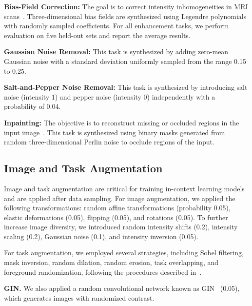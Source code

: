 \vspace{0.4em}\noindent\textbf{Bias-Field Correction:} The goal is to correct intensity inhomogeneities in MRI scans~\cite{goldfryd2021deep}. Three-dimensional bias fields are synthesized using Legendre polynomials with randomly sampled coefficients. For all enhancement tasks, we perform evaluation on five held-out sets and report the average results.

\vspace{0.4em}\noindent\textbf{Gaussian Noise Removal:} This task is synthesized by adding zero-mean Gaussian noise with a standard deviation uniformly sampled from the range 0.15 to 0.25.

\vspace{0.4em}\noindent\textbf{Salt-and-Pepper Noise Removal:} This task is synthesized by introducing salt noise (intensity 1) and pepper noise (intensity 0) independently with a probability of 0.04.

\vspace{0.4em}\noindent\textbf{Inpainting:} The objective is to reconstruct missing or occluded regions in the input image~\cite{liu2021symmetric}. This task is synthesized using binary masks generated from random three-dimensional Perlin noise to occlude regions of the input.



\subsection{Image and Task Augmentation}
\label{sec:aug}

Image and task augmentation are critical for training in-context learning models and are applied after data sampling.  
For image augmentation, we applied the following transformations: random affine transformations (probability 0.05), elastic deformations (0.05), flipping (0.05), and rotations (0.05).  
To further increase image diversity, we introduced random intensity shifts (0.2), intensity scaling (0.2), Gaussian noise (0.1), and intensity inversion (0.05).

For task augmentation, we employed several strategies, including Sobel filtering, mask inversion, random dilation, random erosion, task overlapping, and foreground randomization, following the procedures described in~\cite{hu2025building}.

\vspace{0.4em}
\noindent\textbf{GIN.}
We also applied a random convolutional network known as GIN~\cite{ouyang2022causality} (0.05), which generates images with randomized contrast.

